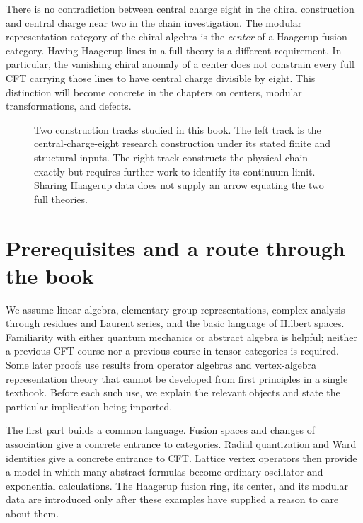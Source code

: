 There is no contradiction between central charge eight in the chiral
construction and central charge near two in the chain investigation.
The modular representation category of the chiral algebra is the
\emph{center} of a Haagerup fusion category. Having Haagerup lines in
a full theory is a different requirement. In particular, the
vanishing chiral anomaly of a center does not constrain every full
CFT carrying those lines to have central charge divisible by eight.
This distinction will become concrete in the chapters on centers,
modular transformations, and defects.

\begin{figure}[htbp]
\centering

\caption{Two construction tracks studied in this book. The left
track is the central-charge-eight research construction under its
stated finite and structural inputs. The right track constructs
the physical chain exactly but requires further work to identify
its continuum limit. Sharing Haagerup data does not supply an
arrow equating the two full theories.}
\label{fig:reading-map}
\end{figure}

\section*{Prerequisites and a route through the book}

We assume linear algebra, elementary group representations, complex
analysis through residues and Laurent series, and the basic language
of Hilbert spaces. Familiarity with either quantum mechanics or
abstract algebra is helpful; neither a previous CFT course nor a
previous course in tensor categories is required. Some later proofs
use results from operator algebras and vertex-algebra representation
theory that cannot be developed from first principles in a single
textbook. Before each such use, we explain the relevant objects and
state the particular implication being imported.

The first part builds a common language. Fusion spaces and changes of
association give a concrete entrance to categories. Radial quantization
and Ward identities give a concrete entrance to CFT. Lattice vertex
operators then provide a model in which many abstract formulas become
ordinary oscillator and exponential calculations. The Haagerup fusion
ring, its center, and its modular data are introduced only after these
examples have supplied a reason to care about them.

